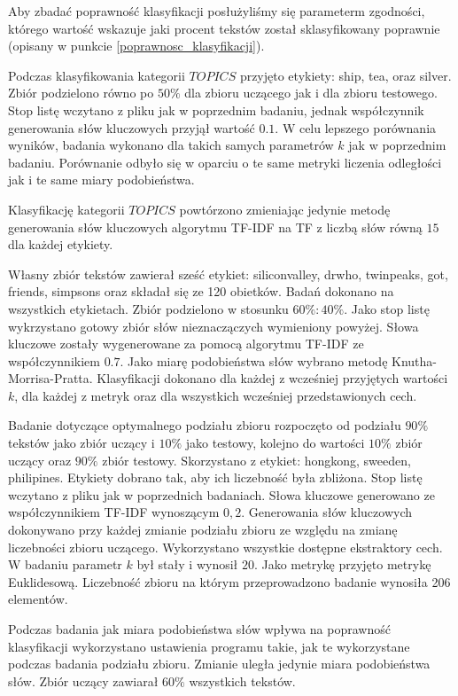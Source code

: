 \documentclass{classrep}
\begin{document}
Aby zbadać poprawność klasyfikacji posłużyliśmy się parameterm zgodności, którego wartość wskazuje
jaki procent tekstów został sklasyfikowany poprawnie (opisany w punkcie \ref{poprawnosc_klasyfikacji}).

Podczas klasyfikowania kategorii $TOPICS$ przyjęto etykiety: ship, tea, oraz silver.
Zbiór podzielono równo po $50\%$ dla zbioru uczącego jak i dla zbioru testowego. Stop listę wczytano z pliku
jak w poprzednim badaniu, jednak współczynnik generowania słów kluczowych przyjął wartość $0.1$. W celu lepszego
porównania wyników, badania wykonano dla takich samych parametrów $k$ jak w poprzednim badaniu. Porównanie odbyło
się w oparciu o te same metryki liczenia odległości jak i te same miary podobieństwa.

Klasyfikację kategorii $TOPICS$ powtórzono zmieniając jedynie
metodę generowania słów kluczowych algorytmu TF-IDF na TF z liczbą słów równą $15$ dla każdej etykiety.

Własny zbiór tekstów zawierał sześć etykiet: siliconvalley, drwho, twinpeaks, got, friends, simpsons
oraz składał się ze 120 obietków. Badań dokonano na wszystkich etykietach. Zbiór podzielono
w stosunku $60\%:40\%$. Jako stop listę wykrzystano
gotowy zbiór słów nieznaczączych wymieniony powyżej. Słowa kluczowe zostały wygenerowane za pomocą
algorytmu TF-IDF ze współczynnikiem $0.7$. Jako miarę podobieństwa słów wybrano metodę Knutha-Morrisa-Pratta.
Klasyfikacji dokonano dla każdej z wcześniej przyjętych wartości $k$, dla każdej z metryk oraz dla
wszystkich wcześniej przedstawionych cech.

Badanie dotyczące optymalnego podziału zbioru rozpoczęto od podziału $90\%$ tekstów jako zbiór uczący i
$10\%$ jako testowy, kolejno do wartości $10\%$ zbiór uczący oraz $90\%$ zbiór testowy. Skorzystano z
etykiet: hongkong, sweeden, philipines. Etykiety dobrano tak, aby ich liczebność była zbliżona.
Stop listę wczytano z pliku jak w poprzednich badaniach. Słowa kluczowe generowano ze współczynnikiem
TF-IDF wynoszącym $0,2$. Generowania słów kluczowych dokonywano przy każdej zmianie podziału zbioru
ze względu na zmianę liczebności zbioru uczącego. Wykorzystano wszystkie dostępne ekstraktory cech.
W badaniu parametr $k$ był
stały i wynosił $20$. Jako metrykę przyjęto metrykę Euklidesową. Liczebność zbioru na którym
przeprowadzono badanie wynosiła 206 elementów.

Podczas badania jak miara podobieństwa słów wpływa na poprawność klasyfikacji wykorzystano ustawienia
programu takie, jak te wykorzystane podczas badania podziału zbioru. Zmianie uległa jedynie miara podobieństwa słów.
Zbiór uczący zawiarał $60\%$ wszystkich tekstów.
\end{document}
